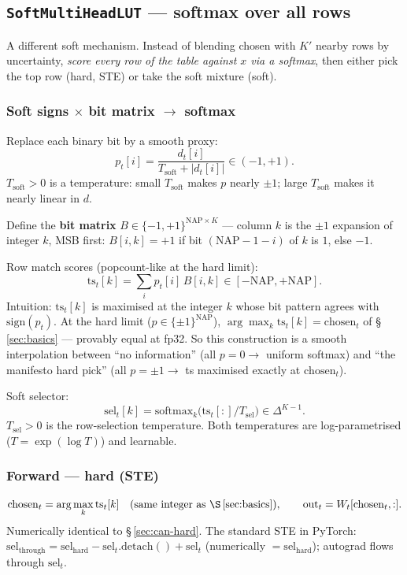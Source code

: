 \documentclass[11pt]{article}
\begin{document}
\subsection{\texttt{SoftMultiHeadLUT} --- softmax over all rows}\label{sec:soft}

A different soft mechanism. Instead of blending chosen with $K'$ nearby
rows by uncertainty, \emph{score every row of the table against $x$ via a
softmax}, then either pick the top row (hard, STE) or take the soft
mixture (soft).

\subsubsection{Soft signs $\times$ bit matrix $\to$ softmax}\label{sec:soft-construct}

Replace each binary bit by a smooth proxy:
\[
  p_t[i] = \frac{d_t[i]}{T_{\mathrm{soft}} + |d_t[i]|}\in(-1,+1).
\]
$T_{\mathrm{soft}}>0$ is a temperature: small $T_{\mathrm{soft}}$ makes $p$ nearly $\pm 1$;
large $T_{\mathrm{soft}}$ makes it nearly linear in $d$.

Define the \textbf{bit matrix} $B\in\{-1,+1\}^{\mathrm{NAP}\times K}$ ---
column $k$ is the $\pm 1$ expansion of integer $k$, MSB first:
$B[i,k]=+1$ if bit $(\mathrm{NAP}{-}1{-}i)$ of $k$ is $1$, else $-1$.

Row match scores (popcount-like at the hard limit):
\[
  \mathrm{ts}_t[k] = \sum_i p_t[i]\,B[i,k]\in[-\mathrm{NAP},+\mathrm{NAP}].
\]
Intuition: $\mathrm{ts}_t[k]$ is maximised at the integer $k$ whose bit pattern
agrees with $\mathrm{sign}(p_t)$. At the hard limit ($p\in\{\pm 1\}^{\mathrm{NAP}}$),
$\arg\max_k\mathrm{ts}_t[k] = \mathrm{chosen}_t$ of \S\,\ref{sec:basics} --- provably equal
at fp32. So this construction is a smooth interpolation between ``no
information'' (all $p{=}0\to$ uniform softmax) and ``the manifesto hard
pick'' (all $p{=}\pm 1\to$ ts maximised exactly at $\mathrm{chosen}_t$).

Soft selector:
\[
  \mathrm{sel}_t[k] = \mathrm{softmax}_k\bigl(\mathrm{ts}_t[:]/T_{\mathrm{sel}}\bigr)\in\Delta^{K-1}.
\]
$T_{\mathrm{sel}}>0$ is the row-selection temperature. Both temperatures are
log-parametrised ($T=\exp(\log T)$) and learnable.

\subsubsection{Forward --- hard (STE)}\label{sec:soft-hard}
\[
  \mathrm{chosen}_t = \arg\max_k \mathrm{ts}_t[k]\quad(\text{same integer as
\S\,\ref{sec:basics}}),\qquad
  \text{out}_t = W_t[\mathrm{chosen}_t,:].
\]
Numerically identical to \S\,\ref{sec:can-hard}. The standard STE in PyTorch:
$\mathrm{sel}_{\mathrm{through}} = \mathrm{sel}_{\mathrm{hard}} - \mathrm{sel}_t.\mathrm{detach}() + \mathrm{sel}_t$
(numerically $=\mathrm{sel}_{\mathrm{hard}}$); autograd flows through $\mathrm{sel}_t$.
\end{document}
